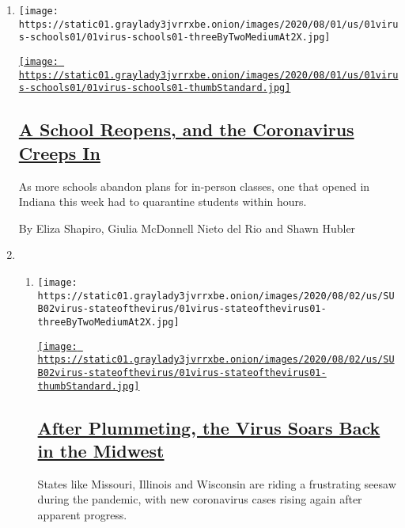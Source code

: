 \begin{enumerate}
\def\labelenumi{\arabic{enumi}.}
\item
  \texttt{[image: https://static01.graylady3jvrrxbe.onion/images/2020/08/01/us/01virus-schools01/01virus-schools01-threeByTwoMediumAt2X.jpg]}

  \href{/2020/08/01/us/schools-reopening-indiana-coronavirus.html}{\texttt{[image: https://static01.graylady3jvrrxbe.onion/images/2020/08/01/us/01virus-schools01/01virus-schools01-thumbStandard.jpg]}}

  \hypertarget{a-school-reopens-and-the-coronavirus-creeps-in}{%
  \subsection{\texorpdfstring{\href{/2020/08/01/us/schools-reopening-indiana-coronavirus.html}{A
  School Reopens, and the Coronavirus Creeps
  In}}{A School Reopens, and the Coronavirus Creeps In}}\label{a-school-reopens-and-the-coronavirus-creeps-in}}

  As more schools abandon plans for in-person classes, one that opened
  in Indiana this week had to quarantine students within hours.

  By Eliza Shapiro, Giulia McDonnell Nieto del Rio and Shawn Hubler
\item
  \begin{enumerate}
  \def\labelenumii{\arabic{enumii}.}
  \item
    \texttt{[image: https://static01.graylady3jvrrxbe.onion/images/2020/08/02/us/SUB02virus-stateofthevirus/01virus-stateofthevirus01-threeByTwoMediumAt2X.jpg]}

    \href{/2020/08/01/us/coronavirus-midwest-cases-deaths.html}{\texttt{[image: https://static01.graylady3jvrrxbe.onion/images/2020/08/02/us/SUB02virus-stateofthevirus/01virus-stateofthevirus01-thumbStandard.jpg]}}

    \hypertarget{after-plummeting-the-virus-soars-back-in-the-midwest}{%
    \subsection{\texorpdfstring{\href{/2020/08/01/us/coronavirus-midwest-cases-deaths.html}{After
    Plummeting, the Virus Soars Back in the
    Midwest}}{After Plummeting, the Virus Soars Back in the Midwest}}\label{after-plummeting-the-virus-soars-back-in-the-midwest}}

    States like Missouri, Illinois and Wisconsin are riding a
    frustrating seesaw during the pandemic, with new coronavirus cases
    rising again after apparent progress.


\end{enumerate}
\end{enumerate}
